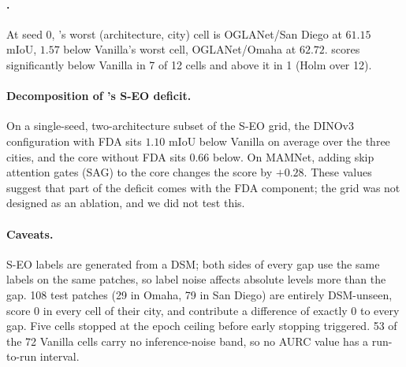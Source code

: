 \paragraph{\sib{}.} At seed 0, \sib{}'s worst (architecture, city) cell is OGLANet/San Diego at
$61.15$ mIoU, $1.57$ below Vanilla's worst cell, OGLANet/Omaha at $62.72$. \sib{} scores
significantly below Vanilla in 7 of 12 cells and above it in 1 (Holm over 12).

\paragraph{Decomposition of \sib{}'s S-EO deficit.} On a single-seed, two-architecture
subset of the S-EO grid, the DINOv3 \sib{} configuration with FDA sits $1.10$ mIoU below
Vanilla on average over the three cities, and the \sib{} core without FDA sits $0.66$ below.
On MAMNet, adding skip attention gates (SAG) to the core changes the score by $+0.28$. These
values suggest that part of the deficit comes with the FDA component; the grid was not
designed as an ablation, and we did not test this.

\paragraph{Caveats.} S-EO labels are generated from a DSM; both sides of every gap use the
same labels on the same patches, so label noise affects absolute levels more than the gap.
108 test patches (29 in Omaha, 79 in San Diego) are entirely DSM-unseen, score 0 in every
cell of their city, and contribute a difference of exactly 0 to every gap. Five cells
stopped at the epoch ceiling before early stopping triggered. 53 of the 72 Vanilla cells
carry no inference-noise band, so no AURC value has a run-to-run interval.